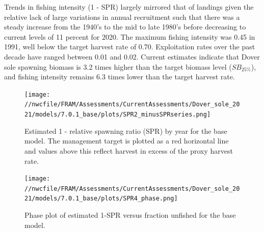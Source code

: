 \documentclass[11pt,
  english,
  a4paper,
]{article}
\begin{document}

Trends in fishing intensity (1 - SPR) largely mirrored that of landings given the relative lack of large variations in annual recruitment such that there was a steady increase from the 1940's to the mid to late 1980's before decreasing to current levels of 11 percent for 2020. The maximum fishing intensity was 0.45 in 1991, well below the target harvest rate of 0.70. Exploitation rates over the past decade have ranged between 0.01 and 0.02. Current estimates indicate that Dover sole spawning biomass is 3.2 times higher than the target biomass level ({\(SB_{25\%}\)\leavevmode\tagmcend\tagstructend}), and fishing intensity remains 6.3 times lower than the target harvest rate.

\leavevmode\tagmcend\tagstructend\par




\begin{figure}
\centering
\texttt{[image: //nwcfile/FRAM/Assessments/CurrentAssessments/Dover\_sole\_2021/models/7.0.1\_base/plots/SPR2\_minusSPRseries.png]}
\caption{Estimated 1 - relative spawning ratio (SPR) by year for the base model. The management target is plotted as a red horizontal line and values above this reflect harvest in excess of the proxy harvest rate.\label{fig:es-1-spr}}
\end{figure}

\tagmcend\tagstructend


\begin{figure}
\centering
\texttt{[image: //nwcfile/FRAM/Assessments/CurrentAssessments/Dover\_sole\_2021/models/7.0.1\_base/plots/SPR4\_phase.png]}
\caption{Phase plot of estimated 1-SPR versus fraction unfished for the base model.\label{fig:es-phase}}
\end{figure}

\tagmcend\tagstructend

\clearpage
\end{document}
